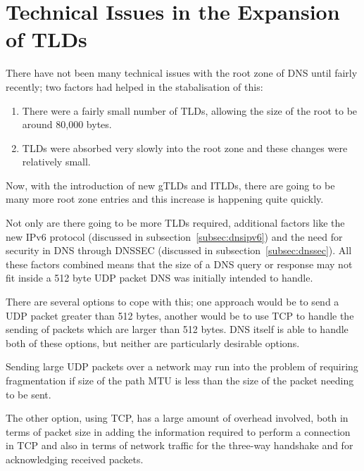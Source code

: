 \documentclass[11pt, a4paper]{article}
\begin{document}


\newpage
\section{Technical Issues in the Expansion of TLDs}

There have not been many technical issues with the root zone of \gls{DNS} until
fairly recently; two factors had helped in the stabalisation of 
this\cite{manning2011challenges}:

\begin{enumerate}
\item There were a fairly small number of \glspl{TLD}, allowing the size of the
      root to be around 80,000 bytes.
\item \glspl{TLD} were absorbed very slowly into the root zone and these
      changes were relatively small.
\end{enumerate}

Now, with the introduction of new \glspl{gTLD} and \glspl{ITLD}, there are 
going to be many more root zone entries and this increase is happening quite
quickly.

Not only are there going to be more \glspl{TLD} required, additional factors
like the new IPv6 protocol (discussed in subsection~\ref{subsec:dnsipv6}) and 
the need for security in \gls{DNS} through \gls{DNSSEC}\cite{rfc2535} 
(discussed in subsection~\ref{subsec:dnssec}). All these factors combined means
that the size of a \gls{DNS} query or response may not fit inside a 512 byte 
\gls{UDP} packet \gls{DNS} was initially intended to handle.

There are several options to cope with this; one approach would be to send a
\gls{UDP} packet greater than 512 bytes, another would be to use \gls{TCP} to
handle the sending of packets which are larger than 512 bytes. \gls{DNS} itself
is able to handle both of these options, but neither are particularly desirable
options.

Sending large \gls{UDP} packets over a network may run into the problem of 
requiring fragmentation if size of the path \gls{MTU} is less than the size of
the packet needing to be sent.

The other option, using \gls{TCP}, has a large amount of overhead involved, 
both in terms of packet size in adding the information required to perform a
connection in \gls{TCP} and also in terms of network traffic for the three-way 
handshake and for acknowledging received packets.
\end{document}

